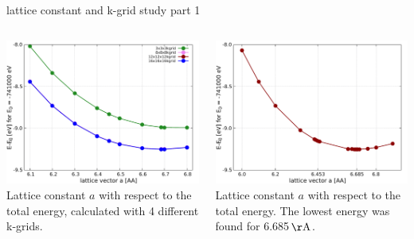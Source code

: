 \begin{frame}{lattice constant and k-grid study part 1}
	\begin{columns}
		\begin{column}{0.48\linewidth}
			\centering
			\includegraphics[width=\linewidth]{andere_bilder/plot_energies_hgte_bulk_all_kgrid_in_one.pdf}
			\\
			Lattice constant $a$ with respect to the total energy, calculated with 4 different k-grids. 
		\end{column}
		\begin{column}{0.48\linewidth}
			\centering
			\includegraphics[width=\linewidth]{andere_bilder/lattice_constant_study_spin_none_no_soc.pdf}
			\\
			Lattice constant $a$ with respect to the total energy. The lowest energy was found for 6.685\,$\unit{\AA}$. %
		\end{column}
	\end{columns}
\end{frame}

